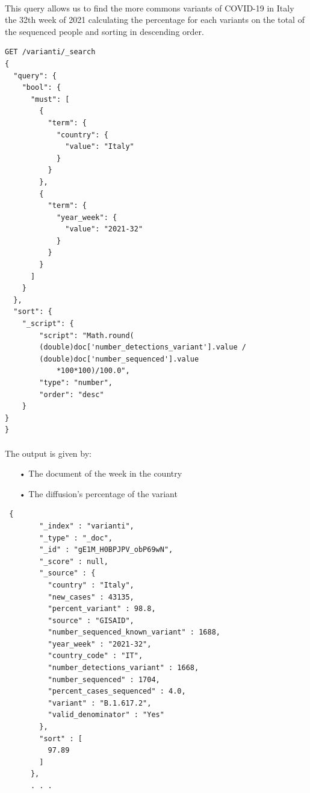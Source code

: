 \documentclass[a4paper,12pt]{article}
\begin{document}
\paragraph{} This query allows us to find the more commons variants of COVID-19 in Italy the 32th week of 2021 calculating the percentage for each variants on the total of the sequenced people and sorting in descending order.
\begin{tcolorbox}[colback=green!5!white,colframe=green!75!black,title=QUERY]
\begin{verbatim}
GET /varianti/_search
{
  "query": {
    "bool": {
      "must": [
        {
          "term": {
            "country": {
              "value": "Italy"
            }
          }
        },
        {
          "term": {
            "year_week": {
              "value": "2021-32"
            }
          }
        }
      ]
    }
  },
  "sort": {
    "_script": {
        "script": "Math.round(
        (double)doc['number_detections_variant'].value / 
        (double)doc['number_sequenced'].value 
        	*100*100)/100.0",
        "type": "number",
        "order": "desc"
    }
}
}
\end{verbatim}
\end{tcolorbox}
\newpage

\paragraph{} The output is given by: 
\begin{itemize}[noitemsep]
\item[•] The document of the week in the country
\item[•] The diffusion's percentage of the variant
\end{itemize}

\begin{tcolorbox}[colback=red!5!white,colframe=red!75!black,title=OUTPUT]
\begin{verbatim}
 {
        "_index" : "varianti",
        "_type" : "_doc",
        "_id" : "gE1M_H0BPJPV_obP69wN",
        "_score" : null,
        "_source" : {
          "country" : "Italy",
          "new_cases" : 43135,
          "percent_variant" : 98.8,
          "source" : "GISAID",
          "number_sequenced_known_variant" : 1688,
          "year_week" : "2021-32",
          "country_code" : "IT",
          "number_detections_variant" : 1668,
          "number_sequenced" : 1704,
          "percent_cases_sequenced" : 4.0,
          "variant" : "B.1.617.2",
          "valid_denominator" : "Yes"
        },
        "sort" : [
          97.89
        ]
      },
      . . .
\end{verbatim}
\end{tcolorbox}
\newpage
\end{document}
